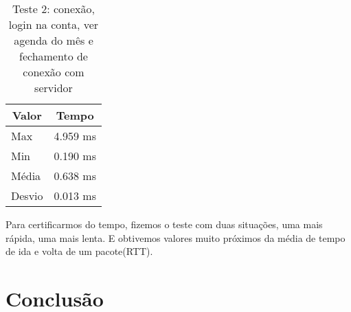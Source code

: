 \documentclass[10pt,a4paper]{article}
\begin{document}
\begin{table}[h!]
\caption{Teste 2: conexão, login na conta, ver agenda do mês e fechamento de conexão com servidor}
\begin{center}
  \begin{tabular}{lr}
    \multicolumn{1}{c}{Valor} & \multicolumn{1}{c}{Tempo}\\
    \hline
    Max & 4.959 ms\\
    Min & 0.190 ms\\
    Média & 0.638 ms \\
    Desvio & 0.013 ms
  \end{tabular}

\end{center}
\end{table}

Para certificarmos do tempo, fizemos o teste com
duas situações, uma mais rápida, uma mais lenta. E obtivemos valores
muito próximos da média de tempo de ida e volta de um pacote(RTT). 

\section{Conclusão}


\begin{small}
  
\end{small}
\end{document}
